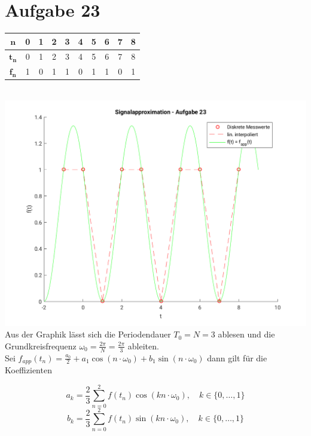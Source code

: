 

	\section*{Aufgabe 23}
	\begin{tabular}{|c|c|c|c|c|c|c|c|c|c|}
		\hline
		$\mathbf{n}$   & 0 & 1 & 2 & 3   & 4 & 5 & 6 & 7 & 8 \\
		\hline
		$\mathbf{t_n}$ & 0 & 1 & 2 & 3   & 4 & 5 & 6 & 7 & 8 \\
		\hline
		$\mathbf{f_n}$ & 1 & 0 & 1 & 1 & 0 & 1 & 1 & 0 & 1\\
		\hline
	\end{tabular} \\
	\includegraphics[scale = 0.7]{A23_plot.png}\\
	Aus der Graphik lässt sich die Periodendauer $T_0 = N = 3$ ablesen und die Grundkreisfrequenz $\omega _0 = \frac{2\pi}{N} = \frac{2\pi}{3}$ ableiten.\\
	Sei $f_{app}(t_n) = \frac{a_0}{2} + a_1\cos\left(n\cdot\omega_0\right) + b_1\sin\left(n\cdot\omega_0\right)$ dann gilt für die Koeffizienten
	
	$$a_k = \frac{2}{3}\sum_{n=0}^2f(t_n)\cos\left(kn\cdot \omega_0\right),\quad k\in\{ 0, \dots, 1\}$$
	$$b_k = \frac{2}{3}\sum_{n=0}^2f(t_n)\sin\left(kn\cdot \omega_0\right),\quad k\in\{ 0, \dots, 1\}$$
	
